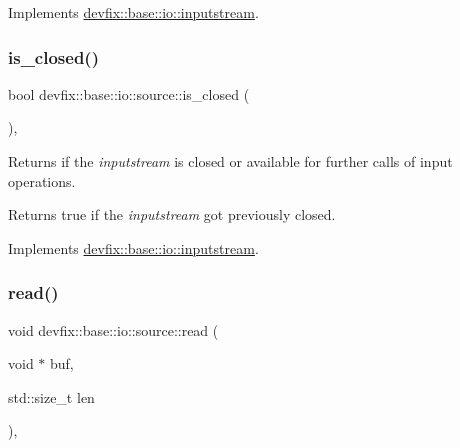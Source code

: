 Implements \hyperlink{structdevfix_1_1base_1_1io_1_1inputstream_a1188eff97757eb9625be91dfeca17af7}{devfix\+::base\+::io\+::inputstream}.

\mbox{\label{structdevfix_1_1base_1_1io_1_1source_a406834cf6651d48949b96d0ef49cc6c1}} 
\subsubsection{\texorpdfstring{is\+\_\+closed()}{is\_closed()}}
{\footnotesize\ttfamily bool devfix\+::base\+::io\+::source\+::is\+\_\+closed (\begin{DoxyParamCaption}{ }\end{DoxyParamCaption})\hspace{0.3cm}{\ttfamily [override]}, {\ttfamily [virtual]}}



Returns if the {\itshape inputstream} is closed or available for further calls of input operations. 

\begin{DoxyReturn}{Returns}
true if the {\itshape inputstream} got previously closed. 
\end{DoxyReturn}


Implements \hyperlink{structdevfix_1_1base_1_1io_1_1inputstream_a9da6b400424ff476ed0479193c219fa9}{devfix\+::base\+::io\+::inputstream}.

\mbox{\label{structdevfix_1_1base_1_1io_1_1source_a9fbd4d20aa150910ced44018e1b3156a}} 
\subsubsection{\texorpdfstring{read()}{read()}}
{\footnotesize\ttfamily void devfix\+::base\+::io\+::source\+::read (\begin{DoxyParamCaption}\item[{void $\ast$}]{buf,  }\item[{std\+::size\+\_\+t}]{len }\end{DoxyParamCaption})\hspace{0.3cm}{\ttfamily [override]}, {\ttfamily [virtual]}}



